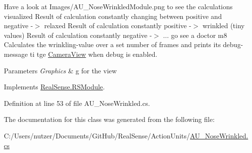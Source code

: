 Have a look at Images/\+A\+U\+\_\+\+Nose\+Wrinkled\+Module.\+png to see the calculations visualized Result of calculation constantly changing between positive and negative -\/$>$ relaxed Result of calculation constantly positive -\/$>$ wrinkled (tiny values) Result of calculation constantly negative -\/$>$ ... go see a doctor m8 Calculates the wrinkling-\/value over a set number of frames and prints its\textquotesingle{} debug-\/message ti tge \hyperlink{class_real_sense_1_1_camera_view}{Camera\+View} when debug is enabled. 
\begin{DoxyParams}{Parameters}
{\em Graphics} & g for the view \\
\hline
\end{DoxyParams}


Implements \hyperlink{class_real_sense_1_1_r_s_module_a2ec830b7932ee7c0077d473f81c73867}{Real\+Sense.\+R\+S\+Module}.



Definition at line 53 of file A\+U\+\_\+\+Nose\+Wrinkled.\+cs.



The documentation for this class was generated from the following file\+:\begin{DoxyCompactItemize}
\item 
C\+:/\+Users/nutzer/\+Documents/\+Git\+Hub/\+Real\+Sense/\+Action\+Units/\hyperlink{_a_u___nose_wrinkled_8cs}{A\+U\+\_\+\+Nose\+Wrinkled.\+cs}\end{DoxyCompactItemize}
